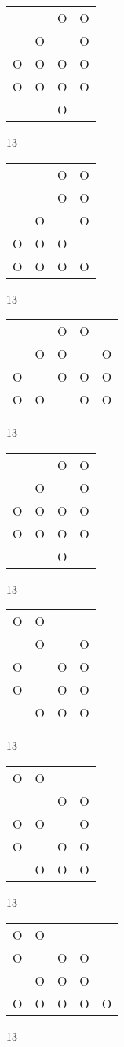 \begin{tabular}{|m{0.2cm}m{0.2cm}m{0.2cm}m{0.2cm}|}\hline
 & &O&O\\
 &O& &O\\
O&O&O&O\\
O&O&O&O\\
 & &O& \\
\hline\end{tabular}13
\begin{tabular}{|m{0.2cm}m{0.2cm}m{0.2cm}m{0.2cm}|}\hline
 & &O&O\\
 & &O&O\\
 &O& &O\\
O&O&O& \\
O&O&O&O\\
\hline\end{tabular}13
\begin{tabular}{|m{0.2cm}m{0.2cm}m{0.2cm}m{0.2cm}m{0.2cm}|}\hline
 & &O&O& \\
 &O&O& &O\\
O& &O&O&O\\
O&O& &O&O\\
\hline\end{tabular}13
\begin{tabular}{|m{0.2cm}m{0.2cm}m{0.2cm}m{0.2cm}|}\hline
 & &O&O\\
 &O& &O\\
O&O&O&O\\
O&O&O&O\\
 & &O& \\
\hline\end{tabular}13
\begin{tabular}{|m{0.2cm}m{0.2cm}m{0.2cm}m{0.2cm}|}\hline
O&O& & \\
 &O& &O\\
O& &O&O\\
O& &O&O\\
 &O&O&O\\
\hline\end{tabular}13
\begin{tabular}{|m{0.2cm}m{0.2cm}m{0.2cm}m{0.2cm}|}\hline
O&O& & \\
 & &O&O\\
O&O& &O\\
O& &O&O\\
 &O&O&O\\
\hline\end{tabular}13
\begin{tabular}{|m{0.2cm}m{0.2cm}m{0.2cm}m{0.2cm}m{0.2cm}|}\hline
O&O& & & \\
O& &O&O& \\
 &O&O&O& \\
O&O&O&O&O\\
\hline\end{tabular}13
